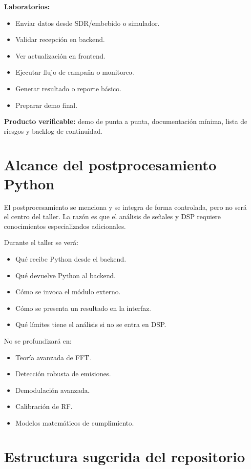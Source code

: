 \documentclass[11pt,a4paper]{article}
\newcommand{\producto}{\textbf{Producto verificable:} }
\begin{document}
\textbf{Laboratorios:}

\begin{itemize}
  \item Enviar datos desde SDR/embebido o simulador.
  \item Validar recepción en backend.
  \item Ver actualización en frontend.
  \item Ejecutar flujo de campaña o monitoreo.
  \item Generar resultado o reporte básico.
  \item Preparar demo final.
\end{itemize}

\producto demo de punta a punta, documentación mínima, lista de riesgos y backlog de continuidad.

\section*{Alcance del postprocesamiento Python}

El postprocesamiento se menciona y se integra de forma controlada, pero no será el centro del taller. La razón es que el análisis de señales y DSP requiere conocimientos especializados adicionales.

Durante el taller se verá:

\begin{itemize}
  \item Qué recibe Python desde el backend.
  \item Qué devuelve Python al backend.
  \item Cómo se invoca el módulo externo.
  \item Cómo se presenta un resultado en la interfaz.
  \item Qué límites tiene el análisis si no se entra en DSP.
\end{itemize}

No se profundizará en:

\begin{itemize}
  \item Teoría avanzada de FFT.
  \item Detección robusta de emisiones.
  \item Demodulación avanzada.
  \item Calibración de RF.
  \item Modelos matemáticos de cumplimiento.
\end{itemize}

\section*{Estructura sugerida del repositorio}
\end{document}
